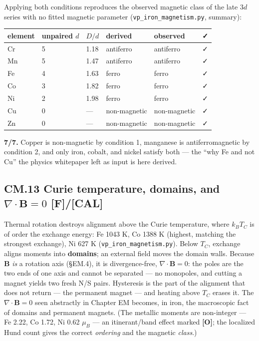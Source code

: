 \documentclass[
  10pt,
]{article}
\begin{document}
Applying both conditions reproduces the observed magnetic class of the
late \(3d\) series with no fitted magnetic parameter
(\texttt{vp\_iron\_magnetism.py}, summary):

\begin{longtable}[]{@{}llllll@{}}
\toprule\noalign{}
element & unpaired \(d\) & \(D/d\) & derived & observed & ✓ \\
\midrule\noalign{}
\endhead
\bottomrule\noalign{}
\endlastfoot
Cr & 5 & 1.18 & antiferro & antiferro & ✓ \\
Mn & 5 & 1.47 & antiferro & antiferro & ✓ \\
Fe & 4 & 1.63 & ferro & ferro & ✓ \\
Co & 3 & 1.82 & ferro & ferro & ✓ \\
Ni & 2 & 1.98 & ferro & ferro & ✓ \\
Cu & 0 & --- & non-magnetic & non-magnetic & ✓ \\
Zn & 0 & --- & non-magnetic & non-magnetic & ✓ \\
\end{longtable}

\textbf{7/7.} Copper is non-magnetic by condition 1, manganese is
antiferromagnetic by condition 2, and only iron, cobalt, and nickel
satisfy both --- the ``why Fe and not Cu'' the physics whitepaper left
as input is here derived.

\hypertarget{cm.13-curie-temperature-domains-and-nablacdotmathbf-b-0-fcal}{%
\subsection{\texorpdfstring{CM.13 Curie temperature, domains, and
\(\nabla\!\cdot\mathbf B = 0\)
\textbf{{[}F{]}/{[}CAL{]}}}{CM.13 Curie temperature, domains, and \textbackslash nabla\textbackslash!\textbackslash cdot\textbackslash mathbf B = 0 {[}F{]}/{[}CAL{]}}}\label{cm.13-curie-temperature-domains-and-nablacdotmathbf-b-0-fcal}}

Thermal rotation destroys alignment above the Curie temperature, where
\(k_BT_C\) is of order the exchange energy: Fe 1043 K, Co 1388 K
(highest, matching the strongest exchange), Ni 627 K
(\texttt{vp\_iron\_magnetism.py}). Below \(T_C\), exchange aligns
moments into \textbf{domains}; an external field moves the domain walls.
Because \(\mathbf B\) \emph{is} a rotation axis (§EM.4), it is
divergence-free, \(\nabla\!\cdot\mathbf B = 0\): the poles are the two
ends of one axis and cannot be separated --- no monopoles, and cutting a
magnet yields two fresh N/S pairs. Hysteresis is the part of the
alignment that does not return --- the permanent magnet --- and heating
above \(T_C\) erases it. The \(\nabla\!\cdot\mathbf B = 0\) seen
abstractly in Chapter EM becomes, in iron, the macroscopic fact of
domains and permanent magnets. (The metallic moments are non-integer ---
Fe 2.22, Co 1.72, Ni 0.62 \(\mu_B\) --- an itinerant/band effect marked
\textbf{{[}O{]}}; the localized Hund count gives the correct
\emph{ordering} and the magnetic \emph{class}.)
\end{document}
